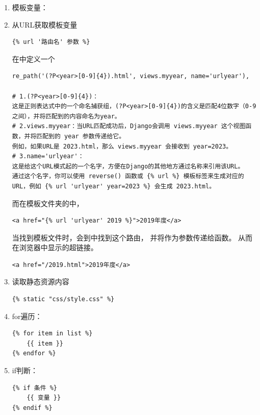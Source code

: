 \begin{enumerate}[label=\arabic*)]
    \item 模板变量：
    \item 从URL获取模板变量
\begin{lstlisting}[style=demostyle, numbers=none]
{% url '路由名' 参数 %}    
\end{lstlisting}    

\begin{example}
    \exProblem
    在中定义一个
\begin{lstlisting}[style=demostyle, numbers=none]
re_path('(?P<year>[0-9]{4}).html', views.myyear, name='urlyear'),        

# 1.(?P<year>[0-9]{4})：
这是正则表达式中的一个命名捕获组，(?P<year>[0-9]{4})的含义是匹配4位数字（0-9之间），并将匹配到的内容命名为year。
# 2.views.myyear：当URL匹配成功后，Django会调用 views.myyear 这个视图函数，并将匹配到的 year 参数传递给它。
例如，如果URL是 2023.html，那么 views.myyear 会接收到 year=2023。
# 3.name='urlyear'：
这是给这个URL模式起的一个名字，方便在Django的其他地方通过名称来引用该URL。
通过这个名字，你可以使用 reverse() 函数或 {% url %} 模板标签来生成对应的URL，例如 {% url 'urlyear' year=2023 %} 会生成 2023.html。
\end{lstlisting}    


    
而在模板文件夹的中，
\begin{lstlisting}[style=demostyle, numbers=none]
<a href="{% url 'urlyear' 2019 %}">2019年度</a>
\end{lstlisting}        
    \exSolution

    当找到模板文件时，会到中找到这个路由，
    并将作为参数传递给函数。
    从而在浏览器中显示的超链接。

\begin{lstlisting}[style=demostyle, numbers=none]
<a href="/2019.html">2019年度</a>
\end{lstlisting}            
    
\end{example}

    \item 读取静态资源内容
\begin{lstlisting}[style=demostyle, numbers=none]
{% static "css/style.css" %} 
\end{lstlisting}
    \item for遍历：
\begin{lstlisting}[style=demostyle, numbers=none]
{% for item in list %}
    {{ item }}
{% endfor %}    
\end{lstlisting}
    \item if判断：
\begin{lstlisting}[style=demostyle, numbers=none]
{% if 条件 %}
    {{ 变量 }}
{% endif %}
\end{lstlisting}       
\end{enumerate}


